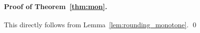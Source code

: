 \paragraph{Proof of Theorem~\ref{thm:mon}.} This directly follows from Lemma~\ref{lem:rounding_monotone}. \qed

